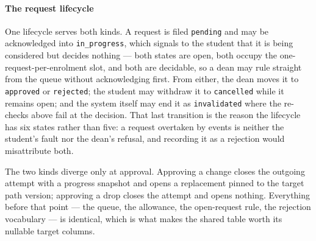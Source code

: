 \paragraph{The request lifecycle}
One lifecycle serves both kinds. A request is filed \texttt{pending} and may be acknowledged into \texttt{in\_progress}, which signals to the student that it is being considered but decides nothing --- both states are open, both occupy the one-request-per-enrolment slot, and both are decidable, so a dean may rule straight from the queue without acknowledging first. From either, the dean moves it to \texttt{approved} or \texttt{rejected}; the student may withdraw it to \texttt{cancelled} while it remains open; and the system itself may end it as \texttt{invalidated} where the re-checks above fail at the decision. That last transition is the reason the lifecycle has six states rather than five: a request overtaken by events is neither the student's fault nor the dean's refusal, and recording it as a rejection would misattribute both.

The two kinds diverge only at approval. Approving a change closes the outgoing attempt with a progress snapshot and opens a replacement pinned to the target path version; approving a drop closes the attempt and opens nothing. Everything before that point --- the queue, the allowance, the open-request rule, the rejection vocabulary --- is identical, which is what makes the shared table worth its nullable target columns.
